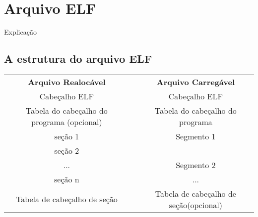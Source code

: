\section{Arquivo ELF}

Explicação


\subsection{A estrutura do arquivo ELF}

\begin{tabular}{|c|c|c|}
\multicolumn{1}{c}{\textbf{Arquivo Realocável}} & \multicolumn{1}{c}{} & \multicolumn{1}{c}{\textbf{Arquivo Carregável}}\tabularnewline
\cline{1-1} \cline{3-3} 
Cabeçalho ELF &  & Cabeçalho ELF\tabularnewline
\cline{1-1} \cline{3-3} 
Tabela do cabeçalho do programa (opcional) &  & Tabela do cabeçalho do programa\tabularnewline
\cline{1-1} \cline{3-3} 
seção 1 &  & Segmento 1\tabularnewline
\cline{1-1} 
seção 2 &  & \tabularnewline
\cline{1-1} \cline{3-3} 
... &  & Segmento 2\tabularnewline
\cline{1-1} \cline{3-3} 
seção n &  & ...\tabularnewline
\cline{1-1} \cline{3-3} 
Tabela de cabeçalho de seção &  & Tabela de cabeçalho de seção(opcional)\tabularnewline
\cline{1-1} \cline{3-3} 
\end{tabular}

